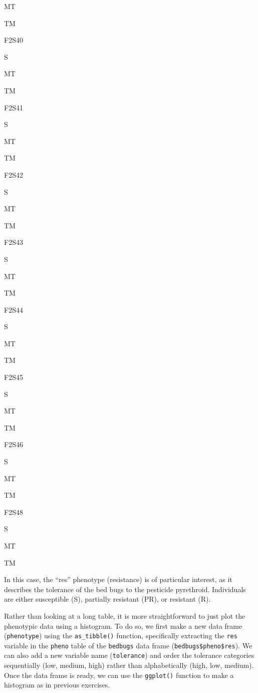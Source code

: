 \documentclass[
]{book}
\begin{document}
MT

TM

F2S40

S

MT

TM

F2S41

S

MT

TM

F2S42

S

MT

TM

F2S43

S

MT

TM

F2S44

S

MT

TM

F2S45

S

MT

TM

F2S46

S

MT

TM

F2S48

S

MT

TM

In this case, the ``res'' phenotype (resistance) is of particular interest, as it describes the tolerance of the bed bugs to the pesticide pyrethroid. Individuals are either susceptible (S), partially resistant (PR), or resistant (R).

Rather than looking at a long table, it is more straightforward to just plot the phenotypic data using a histogram. To do so, we first make a new data frame (\texttt{phenotype}) using the \texttt{as\_tibble()} function, specifically extracting the \texttt{res} variable in the \texttt{pheno} table of the \texttt{bedbugs} data frame (\texttt{bedbugs\$pheno\$res}). We can also add a new variable name (\texttt{tolerance}) and order the tolerance categories sequentially (low, medium, high) rather than alphabetically (high, low, medium). Once the data frame is ready, we can use the \texttt{ggplot()} function to make a histogram as in previous exercises.
\end{document}
